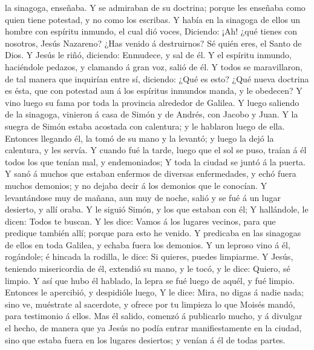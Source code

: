 la sinagoga, enseñaba.  Y se admiraban de su doctrina;
porque les enseñaba como quien tiene potestad, y no como los escribas.
 Y había en la sinagoga de ellos un hombre con espíritu
inmundo, el cual dió voces,  Diciendo: ¡Ah! ¿qué tienes con
nosotros, Jesús Nazareno? ¿Has venido á destruirnos? Sé quién eres, el
Santo de Dios.  Y Jesús le riñó, diciendo: Enmudece, y sal
de él.  Y el espíritu inmundo, haciéndole pedazos, y
clamando á gran voz, salió de él.  Y todos se maravillaron,
de tal manera que inquirían entre sí, diciendo: ¿Qué es esto? ¿Qué nueva
doctrina es ésta, que con potestad aun á los espíritus inmundos manda, y
le obedecen?  Y vino luego su fama por toda la provincia
alrededor de Galilea.  Y luego saliendo de la sinagoga,
vinieron á casa de Simón y de Andrés, con Jacobo y Juan.  Y
la suegra de Simón estaba acostada con calentura; y le hablaron luego de
ella.  Entonces llegando él, la tomó de su mano y la
levantó; y luego la dejó la calentura, y les servía.  Y
cuando fué la tarde, luego que el sol se puso, traían á él todos los que
tenían mal, y endemoniados;  Y toda la ciudad se juntó á la
puerta.  Y sanó á muchos que estaban enfermos de diversas
enfermedades, y echó fuera muchos demonios; y no dejaba decir á los
demonios que le conocían.  Y levantándose muy de mañana,
aun muy de noche, salió y se fué á un lugar desierto, y allí oraba.
 Y le siguió Simón, y los que estaban con él; 
Y hallándole, le dicen: Todos te buscan.  Y les dice: Vamos
á los lugares vecinos, para que predique también allí; porque para esto
he venido.  Y predicaba en las sinagogas de ellos en toda
Galilea, y echaba fuera los demonios.  Y un leproso vino á
él, rogándole; é hincada la rodilla, le dice: Si quieres, puedes
limpiarme.  Y Jesús, teniendo misericordia de él, extendió
su mano, y le tocó, y le dice: Quiero, sé limpio.  Y así
que hubo él hablado, la lepra se fué luego de aquél, y fué limpio.
 Entonces le apercibió, y despidióle luego,  Y
le dice: Mira, no digas á nadie nada; sino ve, muéstrate al sacerdote, y
ofrece por tu limpieza lo que Moisés mandó, para testimonio á ellos.
 Mas él salido, comenzó á publicarlo mucho, y á divulgar el
hecho, de manera que ya Jesús no podía entrar manifiestamente en la
ciudad, sino que estaba fuera en los lugares desiertos; y venían á él de
todas partes.


